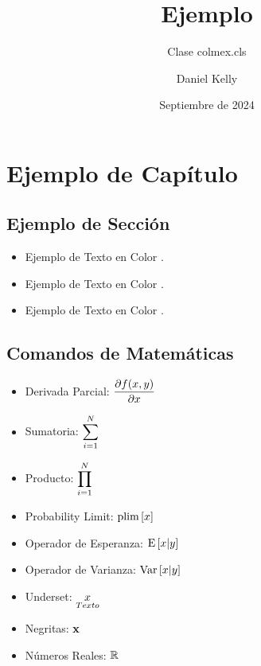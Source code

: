 \documentclass[esp]{colmex}
\institute{Universidad de Procedencia}
\title{Ejemplo}
\subtitle{Clase colmex.cls}
\author{Daniel Kelly}
\date{Septiembre de 2024}
\begin{document}
\maketitle

\chapter{Ejemplo de Capítulo}

\section{Ejemplo de Sección}

\begin{itemize}
    \item Ejemplo de Texto en Color .
    \item Ejemplo de Texto en Color .
    \item Ejemplo de Texto en Color .
\end{itemize}


\section{Comandos de Matemáticas}

\begin{itemize}
    \item Derivada Parcial: $\pd{f(x,y)}{x}$
    \bigskip
    \item Sumatoria: $\dsum{i=1}{N}$
    \bigskip
    \item Producto: $\dprod{i=1}{N}$
    \bigskip
    \item Probability Limit: $\plim{x}$
    \bigskip
    \item Operador de Esperanza: $\E{x|y}$
    \bigskip
    \item Operador de Varianza: $\var{x|y}$
    \bigskip
    \item Underset: $\un{x}{Texto}$
    \bigskip
    \item Negritas: $\mn{x}$
    \bigskip
    \item Números Reales: $\R$
\end{itemize}
\end{document}
